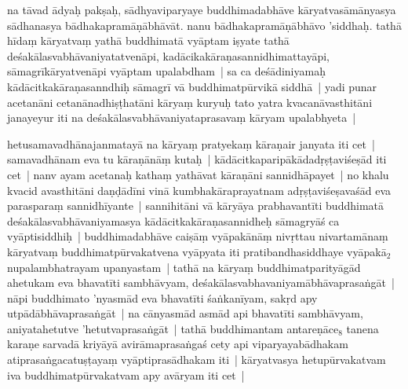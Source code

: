 \documentclass[article,12pt,a4paper]{memoir}%
\newcounter{parCount}
\begin{document}
	  
	

	  
	  \pstart \leavevmode%
	\label{thakur75-40.23}na tāvad ādyaḥ pakṣaḥ, sādhyaviparyaye buddhimadabhāve kāryatvasāmānyasya sādhanasya bādhakapramāṇābhāvāt. nanu bādhakapramāṇā\label{ratnakīrtinibandhāvali__36r1PF7IMWCZ259HVW7MWE6RCOV}bhāvo 'siddhaḥ\label{ratnakīrtinibandhāvali__36r1PF7IMWC93RHV8K3QH5DZGWS}. tathā hīdaṃ kāryatvaṃ yathā buddhimatā vyāptam iṣyate tathā deśakālasvabhāvaniyatatvenāpi, kadācikakāraṇasannidhimattayāpi, sāmagrīkāryatvenāpi vyāptam upalabdham | sa ca deśādiniyamaḥ kādācitkakāraṇasanndhiḥ sāmagrī vā buddhimatpūrvikā siddhā | yadi punar acetanāni cetanānadhiṣṭhatāni kāryaṃ kuryuḥ tato yatra kvacanāvasthitāni janayeyur iti na deśakālasvabhāvaniyataprasavaṃ kāryam upalabhyeta |
	{}
	\pend%
      

	  
	  \pstart \leavevmode%
	\label{thakur75-40.30}hetusamavadhānajanmatayā na kāryaṃ pratyekaṃ kāraṇair janyata iti cet | samavadhānam eva tu kāraṇānāṃ kutaḥ | kādācitkaparipākādadṛṣṭaviśeṣād iti cet | nanv ayam acetanaḥ kathaṃ yathāvat kāraṇāni sannidhāpayet | no khalu kvacid avasthitāni daṇḍādīni vinā kumbhakāraprayatnam adṛṣṭaviśeṣavaśād eva parasparaṃ sannidhīyante | sannihitāni vā kāryāya prabhavantīti buddhimatā deśakālasvabhāvaniyamasya kādācitkakāraṇasannidheḥ sāmagryāś ca vyāptisiddhiḥ | buddhimadabhāve caiṣāṃ vyāpakānāṃ nivṛttau nivartamānaṃ kāryatvaṃ buddhimatpūrvakatvena vyāpyata iti pratibandhasiddhaye vyāpakā{\tiny $_{2}$}\label{RNA-ms-23a-3}nupalambhatrayam upanyastam | \label{ratnakīrtinibandhāvali__36r1PF7IMWBJY889FM807QZKIA6}tathā na\label{ratnakīrtinibandhāvali__36r1PF7IMWATRHA5MXY189N75LV} kāryaṃ buddhimatparityāgād ahetukam eva bhavatīti sambhāvyam, deśakālasvabhavaniyamābhāvaprasaṅgāt | nāpi buddhimato 'nyasmād eva bhavatīti śaṅkanīyam, sakṛd apy utpādābhāvaprasaṅgāt | na cānyasmād asmād api bhavatīti sambhāvyam, aniyatahetutve 'hetutvaprasaṅgāt | tathā buddhimantam antareṇāce{\tiny $_{8}$}\label{ĪSD-41-9} tanena karaṇe sarvadā kriyāyā avirāmaprasaṅgaś cety api viparyayabādhakam atiprasaṅgacatuṣṭayaṃ vyāptiprasādhakam iti | kāryatvasya hetupūrvakatvam iva buddhimatpūrvakatvam apy avāryam iti cet |
	{}
	\pend%
      
\end{document}
